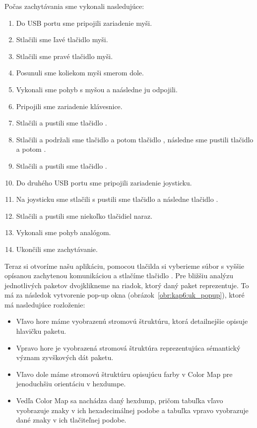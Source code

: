 Počas zachytávania sme vykonali nasledujúce:
\begin{enumerate}
\item Do USB portu sme pripojili zariadenie myši.
\item Stlačili sme ľavé tlačidlo myši.
\item Stlačili sme pravé tlačidlo myši.
\item Posunuli sme koliekom myši smerom dole.
\item Vykonali sme pohyb s myšou a naásledne ju odpojili.
\item Pripojili sme zariadenie klávesnice.
\item Stlačili a pustili sme tlačidlo .
\item Stlačili a podržali sme tlačidlo  a potom tlačidlo , následne sme pustili tlačidlo  a potom .
\item Stlačili a pustili sme tlačidlo .
\item Do druhého USB portu sme pripojili zariadenie joysticku.
\item Na joysticku sme stlačili s pustili sme tlačidlo  a následne tlačidlo .
\item Stlačili a pustili sme niekoľko tlačidiel naraz.
\item Vykonali sme pohyb analógom.
\item Ukončili sme zachytávanie.
\end{enumerate}

Teraz si otvoríme našu aplikáciu, pomocou tlačilda  si vyberieme súbor s vyššie opísanou zachytenou komunikáciou a stlačíme tlačidlo . Pre bližšiu analýzu jednotlivých paketov dvojklikneme na riadok, ktorý daný paket reprezentuje. To má za následok vytvorenie pop-up okna (obrázok~\ref{obr:kap6:uk_popup}), ktoré má nasledujúce rozloženie:
\begin{itemize}
\item Vľavo hore máme vyobrazenú stromovú štruktúru, ktorá detailnejšie opisuje hlavičku paketu.
\item Vpravo hore je vyobrazená stromová štruktúra reprezentujúca sémantický význam zyvškových dát paketu.
\item Vľavo dole máme stromovú štruktúru opisujúcu farby v Color Map pre jenoduchšiu orientáciu v hexdumpe.
\item Vedľa Color Map sa nachádza daný hexdump, pričom tabuľka vľavo vyobrazuje znaky v ich hexadecimálnej podobe a tabuľka vpravo vyobrazuje dané znaky v ich tlačiteľnej podobe.
\end{itemize}

